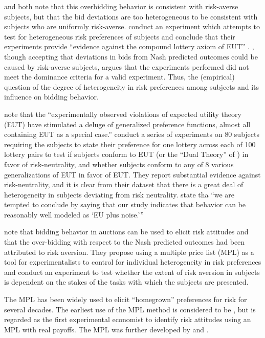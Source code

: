 \documentclass[../main.tex]{subfiles}
\begin{document}
\textcite[160]{Cox1985} and \textcite[749]{Harrison1989} both note that this overbidding behavior is consistent with risk-averse subjects, but that the bid deviations are too heterogeneous to be consistent with subjects who are uniformly risk-averse.
\textcite{Cox1985} conduct an experiment which attempts to test for heterogeneous risk preferences of subjects and conclude that their experiments provide \enquote{evidence against the compound lottery axiom of EUT} \parencite[165]{Cox1985}.
\textcite{Harrison1989}, though accepting that deviations in bids from Nash predicted outcomes could be caused by risk-averse subjects, argues that the experiments performed did not meet the dominance criteria for a valid experiment.
Thus, the (empirical) question of the degree of heterogeneity in risk preferences among subjects and its influence on bidding behavior.

\textcite[1291]{Hey1994} note that the \enquote{experimentally observed violations of expected utility theory (EUT) have stimulated a deluge of generalized preference functions, almost all containing  EUT as a special case.}
\textcite{Hey1994} conduct a series of experiments on 80 subjects requiring the subjects to state their preference for one lottery across each of 100 lottery pairs to test if subjects conform to EUT (or the \enquote{Dual Theory} of \textcite{Yaari1987}) in favor of risk-neutrality, and whether subjects conform to any of 8 various generalizations of EUT in favor of EUT.
They report substantial evidence against risk-neutrality, and it is clear from their dataset that there is a great deal of heterogeneity in subjects deviating from risk neutrality.
\textcite[1322]{Hey1994} state tha \enquote{we are tempted to conclude by saying that our study indicates that behavior can be reasonably well modeled \textelp{} as \enquote{EU plus noise.}} 

\textcite[1644]{Holt2002} note that bidding behavior in auctions can be used to elicit risk attitudes and that the over-bidding with respect to the Nash predicted outcomes had been attributed to risk aversion.
They propose using a multiple price list (MPL) as a tool for experimentalists to control for individual heterogeneity in risk preferences and conduct an experiment to test whether the extent of risk aversion in subjects is dependent on the stakes of the tasks with which the subjects are presented.
 
The MPL has been widely used to elicit \enquote{homegrown} preferences for risk for several decades.
The earliest use of the MPL method is considered to be \textcite{Miller1969}, but \textcite{Binswanger1980, Binswanger1981} is regarded as the first experimental economist to identify risk attitudes using an MPL with real payoffs.
The MPL was further developed by \textcite{Schubert1999} and \textcite{Holt2002}.
\end{document}
